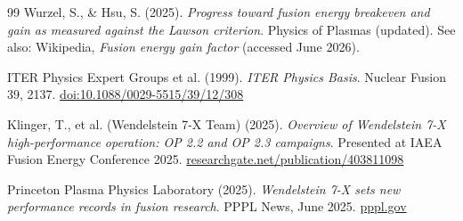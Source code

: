 \documentclass[aps,prd,11pt,onecolumn,superscriptaddress,nofootinbib,floatfix]{revtex4-2}
\begin{document}
\begin{thebibliography}{99}
Wurzel, S., \& Hsu, S. (2025). \textit{Progress toward fusion energy breakeven and gain as measured against the Lawson criterion}. Physics of Plasmas (updated). See also: Wikipedia, \textit{Fusion energy gain factor} (accessed June 2026).

ITER Physics Expert Groups et al. (1999). \textit{ITER Physics Basis}. Nuclear Fusion 39, 2137. \href{https://doi.org/10.1088/0029-5515/39/12/308}{doi:10.1088/0029-5515/39/12/308}

Klinger, T., et al. (Wendelstein 7-X Team) (2025). \textit{Overview of Wendelstein 7-X high-performance operation: OP 2.2 and OP 2.3 campaigns}. Presented at IAEA Fusion Energy Conference 2025. \href{https://www.researchgate.net/publication/403811098}{researchgate.net/publication/403811098}

Princeton Plasma Physics Laboratory (2025). \textit{Wendelstein 7-X sets new performance records in fusion research}. PPPL News, June 2025. \href{https://www.pppl.gov/news/2025/wendelstein-7-x-sets-new-performance-records-fusion-research}{pppl.gov}

\end{thebibliography}
\end{document}
